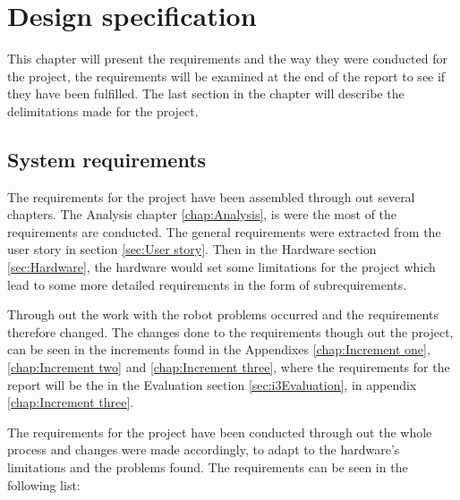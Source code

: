 \chapter{Design specification}
\label{chap:Design specification}
This chapter will present the requirements and the way they were conducted for the project, the requirements will be examined at the end of the report to see if they have been fulfilled. The last section in the chapter will describe the delimitations made for the project.

\section{System requirements}
\label{sec:System requirements}
The requirements for the project have been assembled through out several chapters. The Analysis chapter \ref{chap:Analysis}, is were the most of the requirements are conducted. The general requirements were extracted from the user story in section \ref{sec:User story}. Then in the Hardware section \ref{sec:Hardware}, the hardware would set some limitations for the project which lead to some more detailed requirements in the form of subrequirements.

Through out the work with the robot problems occurred and the requirements therefore changed. The changes done to the requirements though out the project, can be seen in the increments found in the Appendixes \ref{chap:Increment one}, \ref{chap:Increment two} and \ref{chap:Increment three}, where the requirements for the report will be the in the Evaluation section \ref{sec:i3Evaluation}, in appendix \ref{chap:Increment three}.

The requirements for the project have been conducted through out the whole process and changes were made accordingly, to adapt to the hardware's limitations and the problems found. The requirements can be seen in the following list: 

